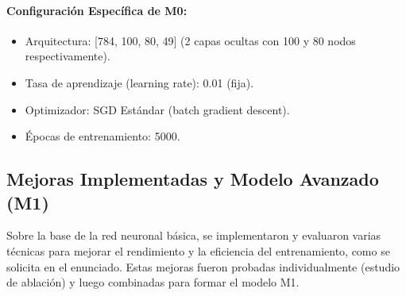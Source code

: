 \documentclass[11pt]{article}
\begin{document}
\paragraph{Configuración Específica de M0:}
\begin{itemize}
    \item Arquitectura: [784, 100, 80, 49] (2 capas ocultas con 100 y 80 nodos respectivamente).
    \item Tasa de aprendizaje (learning rate): 0.01 (fija).
    \item Optimizador: SGD Estándar (batch gradient descent).
    \item Épocas de entrenamiento: 5000.
\end{itemize}

\subsection{Mejoras Implementadas y Modelo Avanzado (M1)}
Sobre la base de la red neuronal básica, se implementaron y evaluaron varias técnicas para mejorar el rendimiento y la eficiencia del entrenamiento, como se solicita en el enunciado. Estas mejoras fueron probadas individualmente (estudio de ablación) y luego combinadas para formar el modelo M1.
\end{document}

